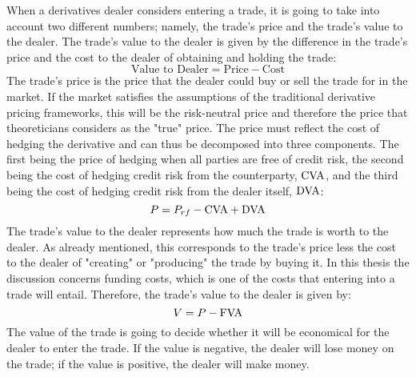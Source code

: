 \documentclass[main.tex]{subfiles}
\begin{document}
    When a derivatives dealer considers entering a trade, 
    it is going to take into account two different numbers; 
    namely, the trade's price and the trade's value to the dealer.
    The trade's value to the dealer is given by the difference in the trade's price
    and the cost to the dealer of obtaining and holding the trade:
        \begin{equation}
            \text{Value to Dealer} 
            =
            \text{Price}
            -
            \text{Cost}
        \end{equation}
    The trade's price is the price that the dealer could buy or sell the trade for in the market.
    If the market satisfies the assumptions of the traditional derivative pricing frameworks,
    this will be the risk-neutral price and therefore the price that 
    theoreticians considers as the "true" price.
    The price must reflect the cost of hedging the derivative
    and can thus be decomposed into three components. 
    The first being the price of hedging when all parties are free of credit risk, 
    the second being the cost of hedging credit risk from the counterparty, $\CVA/$,
    and the third being the cost of hedging credit risk from the dealer itself, $\DVA/$:
        \begin{equation}
            P = 
            P_{rf} 
            -
            \CVA/
            +
            \DVA/
        \end{equation}
    The trade's value to the dealer represents how much the trade is worth to the dealer.
    As already mentioned, this corresponds to the trade's price less the cost to the dealer
    of "creating" or "producing" the trade by buying it.
    In this thesis the discussion concerns funding costs,
    which is one of the costs that entering into a trade will entail.
    Therefore, the trade's value to the dealer is given by:
        \begin{equation}
            V = P - \FVA/
        \end{equation}
    The value of the trade is going to decide whether it will be economical 
    for the dealer to enter the trade. 
    If the value is negative, the dealer will lose money on the trade;
    if the value is positive, the dealer will make money.
    
\end{document}
